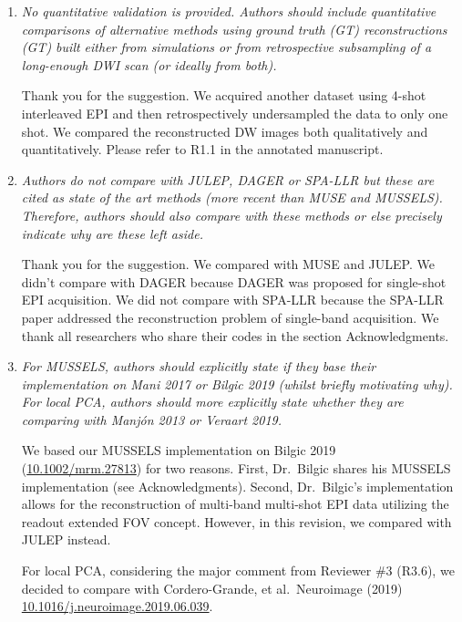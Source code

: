 \documentclass[a4paper,11pt,twoside]{report}
\begin{document}
\begin{enumerate}
    \item \textit{No quantitative validation is provided. Authors should include quantitative comparisons of alternative methods using ground truth (GT) reconstructions (GT) built either from simulations or from retrospective subsampling of a long-enough DWI scan (or ideally from both).}

    \hspace{1em} Thank you for the suggestion.
    We acquired another dataset using 4-shot interleaved EPI
    and then retrospectively undersampled the data to only one shot.
    We compared the reconstructed DW images
    both qualitatively and quantitatively.
    Please refer to R1.1 in the annotated manuscript.

    \item \textit{Authors do not compare with JULEP, DAGER or SPA-LLR but these are cited as state of the art methods (more recent than MUSE and MUSSELS). Therefore, authors should also compare with these methods or else precisely indicate why are these left aside.}

    \hspace{1em} Thank you for the suggestion.
    We compared with MUSE and JULEP.
    We didn't compare with DAGER
    because DAGER was proposed for single-shot EPI acquisition.
    We did not compare with SPA-LLR because
    the SPA-LLR paper addressed the reconstruction problem
    of single-band acquisition.
    We thank all researchers who share their codes
    in the section Acknowledgments.

    \item \textit{For MUSSELS, authors should explicitly state if they base their implementation on Mani 2017 or Bilgic 2019 (whilst briefly motivating why). For local PCA, authors should more explicitly state whether they are comparing with Manjón 2013 or Veraart 2019.}

    \hspace{1em} We based our MUSSELS implementation on
    Bilgic 2019 (\href{https://doi.org/10.1002/mrm.27813}{10.1002/mrm.27813}) for two reasons.
    First, Dr.~Bilgic shares his MUSSELS implementation
    (see Acknowledgments).
    Second, Dr.~Bilgic's implementation allows for the reconstruction of
    multi-band multi-shot EPI data
    utilizing the readout extended FOV concept.
    However, in this revision, we compared with JULEP instead.

    \hspace{1em} For local PCA, considering the major comment
    from Reviewer \#3 (R3.6),
    we decided to compare with Cordero-Grande, et al.~Neuroimage (2019)
    \href{https://doi.org/10.1016/j.neuroimage.2019.06.039}{10.1016/j.neuroimage.2019.06.039}.


\end{enumerate}
\end{document}
